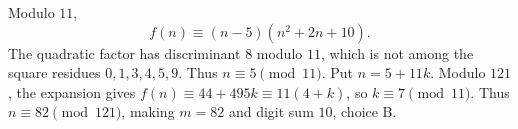 Modulo $11$,
\[f(n)\equiv(n-5)(n^2+2n+10).\]
The quadratic factor has discriminant $8$ modulo $11$, which is not among the square residues $0,1,3,4,5,9$. Thus $n\equiv5\pmod{11}$. Put $n=5+11k$. Modulo $121$, the expansion gives $f(n)\equiv44+495k\equiv11(4+k)$, so $k\equiv7\pmod{11}$. Thus $n\equiv82\pmod{121}$, making $m=82$ and digit sum $\boxed{10}$, choice B.
